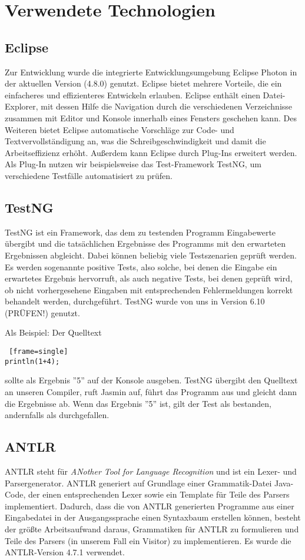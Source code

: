 
\section{Verwendete Technologien}

\subsection{Eclipse}
Zur Entwicklung wurde die integrierte Entwicklungsumgebung Eclipse Photon in der aktuellen Version (4.8.0) genutzt. 
Eclipse bietet mehrere Vorteile, die ein einfacheres und effizienteres Entwickeln erlauben. Eclipse enthält einen Datei-Explorer, mit dessen Hilfe die Navigation durch die verschiedenen Verzeichnisse zusammen mit Editor und Konsole innerhalb eines Fensters geschehen kann. Des Weiteren bietet Eclipse automatische Vorschläge zur Code- und Textvervollständigung an, was die Schreibgeschwindigkeit und damit die Arbeitseffizienz erhöht. 
Außerdem kann Eclipse durch Plug-Ins erweitert werden. Als Plug-In nutzen wir beispielsweise das Test-Framework TestNG, um verschiedene Testfälle automatisiert zu prüfen.

\subsection{TestNG}
TestNG ist ein Framework, das dem zu testenden Programm Eingabewerte übergibt und die tatsächlichen Ergebnisse des Programms mit den erwarteten Ergebnissen abgleicht. Dabei können beliebig viele Testszenarien geprüft werden. Es werden sogenannte positive Tests, also solche, bei denen die Eingabe ein erwartetes Ergebnis hervorruft, als auch negative Tests, bei denen geprüft wird, ob nicht vorhergesehene Eingaben mit entsprechenden Fehlermeldungen korrekt behandelt werden, durchgeführt. TestNG wurde von uns in Version 6.10 (PRÜFEN!) genutzt.

Als Beispiel: Der Quelltext
\begin{lstlisting} [frame=single]
println(1+4);
\end{lstlisting}

sollte als Ergebnis ''5'' auf der Konsole ausgeben. TestNG übergibt den Quelltext an unseren Compiler, ruft Jasmin auf, führt das Programm aus und gleicht dann die Ergebnisse ab. Wenn das Ergebnis ''5'' ist, gilt der Test als bestanden, andernfalls als durchgefallen. 

\subsection{ANTLR}
ANTLR steht für \textit{ANother Tool for Language Recognition} und ist ein Lexer- und Parsergenerator. ANTLR generiert auf Grundlage einer Grammatik-Datei Java-Code, der einen entsprechenden Lexer sowie ein Template für Teile des Parsers implementiert. Dadurch, dass die von ANTLR generierten Programme aus einer Eingabedatei in der Ausgangssprache einen Syntaxbaum erstellen können, besteht der größte Arbeitsaufwand daraus, Grammatiken für ANTLR zu formulieren und Teile des Parsers (in unserem Fall ein Visitor) zu implementieren. Es wurde die ANTLR-Version 4.7.1 verwendet.


